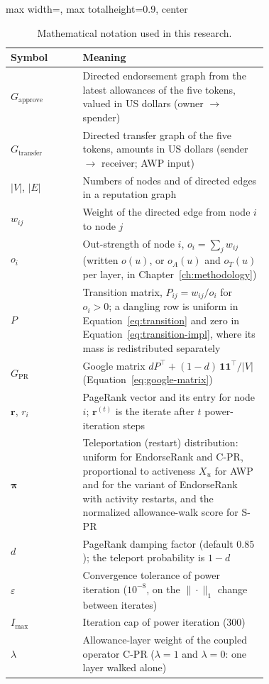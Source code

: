 \begin{table}[htbp]
\centering
\caption{Mathematical notation used in this research.}
\label{tab:notation}
\begin{adjustbox}{max width=\linewidth, max totalheight=0.9\textheight, center}%
\small\setlength{\tabcolsep}{3.5pt}%
\begin{tabular}{lp{0.72\linewidth}}
\toprule
Symbol & Meaning \\
\midrule
$G_{\mathrm{approve}}$ & Directed endorsement graph from the latest allowances of the five tokens, valued in US dollars (owner $\to$ spender) \\
$G_{\mathrm{transfer}}$ & Directed transfer graph of the five tokens, amounts in US dollars (sender $\to$ receiver; AWP input) \\
$|V|$, $|E|$ & Numbers of nodes and of directed edges in a reputation graph \\
$w_{ij}$ & Weight of the directed edge from node $i$ to node $j$ \\
$o_i$ & Out-strength of node $i$, $o_i=\sum_j w_{ij}$ (written $o(u)$, or $o_A(u)$ and $o_T(u)$ per layer, in Chapter~\ref{ch:methodology}) \\
$P$ & Transition matrix, $P_{ij}=w_{ij}/o_i$ for $o_i>0$; a dangling row is uniform in Equation~\eqref{eq:transition} and zero in Equation~\eqref{eq:transition-impl}, where its mass is redistributed separately \\
$G_{\mathrm{PR}}$ & Google matrix $dP^{\top}+(1-d)\,\mathbf{1}\mathbf{1}^{\top}/|V|$ (Equation~\eqref{eq:google-matrix}) \\
$\mathbf{r}$, $r_i$ & PageRank vector and its entry for node $i$; $\mathbf{r}^{(t)}$ is the iterate after $t$ power-iteration steps \\
$\boldsymbol{\pi}$ & Teleportation (restart) distribution: uniform for EndorseRank and C-PR, proportional to activeness $X_u$ for AWP and for the variant of EndorseRank with activity restarts, and the normalized allowance-walk score for S-PR \\
$d$ & PageRank damping factor (default $0.85$); the teleport probability is $1-d$ \\
$\varepsilon$ & Convergence tolerance of power iteration ($10^{-8}$, on the $\|\cdot\|_1$ change between iterates) \\
$I_{\max}$ & Iteration cap of power iteration ($300$) \\
$\lambda$ & Allowance-layer weight of the coupled operator C-PR ($\lambda=1$ and $\lambda=0$: one layer walked alone) \\

\end{tabular}
\end{adjustbox}
\end{table}
